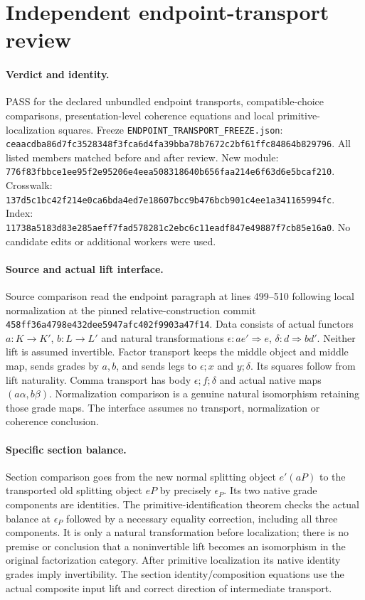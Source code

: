 \documentclass{article}
\begin{document}
\section*{Independent endpoint-transport review}
\paragraph{Verdict and identity.} PASS for the declared unbundled endpoint transports, compatible-choice comparisons, presentation-level coherence equations and local primitive-localization squares. Freeze \texttt{ENDPOINT\_TRANSPORT\_FREEZE.json}: \texttt{ceaacdba86d7fc3528348f3fca6d4fa39bba78b7672c2bf61ffc84864b829796}. All listed members matched before and after review. New module: \texttt{776f83fbbce1ee95f2e95206e4eea508318640b656faa214e6f63d6e5bcaf210}. Crosswalk: \texttt{137d5c1bc42f214e0ca6bda4ed7e18607bcc9b476bcb901c4ee1a341165994fc}. Index: \texttt{11738a5183d83e285aeff7fad578281c2ebc6c11eadf847e49887f7cb85e16a0}. No candidate edits or additional workers were used.
\paragraph{Source and actual lift interface.} Source comparison read the endpoint paragraph at lines 499--510 following local normalization at the pinned relative-construction commit \texttt{458ff36a4798e432dee5947afc402f9903a47f14}. Data consists of actual functors $a:K\to K'$, $b:L\to L'$ and natural transformations $\epsilon:ae'\Rightarrow e$, $\delta:d\Rightarrow bd'$. Neither lift is assumed invertible. Factor transport keeps the middle object and middle map, sends grades by $a,b$, and sends legs to $\epsilon;x$ and $y;\delta$. Its squares follow from lift naturality. Comma transport has body $\epsilon;f;\delta$ and actual native maps $(a\alpha,b\beta)$. Normalization comparison is a genuine natural isomorphism retaining those grade maps. The interface assumes no transport, normalization or coherence conclusion.
\paragraph{Specific section balance.} Section comparison goes from the new normal splitting object $e'(aP)$ to the transported old splitting object $eP$ by precisely $\epsilon_P$. Its two native grade components are identities. The primitive-identification theorem checks the actual balance at $\epsilon_P$ followed by a necessary equality correction, including all three components. It is only a natural transformation before localization; there is no premise or conclusion that a noninvertible lift becomes an isomorphism in the original factorization category. After primitive localization its native identity grades imply invertibility. The section identity/composition equations use the actual composite input lift and correct direction of intermediate transport.
\end{document}
